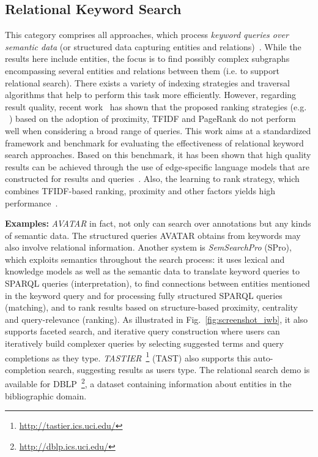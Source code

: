 \subsection{Relational Keyword Search}
This category comprises all approaches, which process \emph{keyword queries over semantic data} (or structured data capturing entities and relations)~\cite{DBLP:conf/icde/TranWRC09,DBLP:conf/cikm/LadwigT11}. While the results here include entities, the focus is to find possibly complex subgraphs encompassing several entities and relations between them (i.e. to support relational search). There exists a variety of indexing strategies and traversal algorithms that help to perform this task more efficiently. However, regarding result quality, recent work~\cite{DBLP:conf/cikm/CoffmanW10} has shown that the proposed ranking strategies (e.g. ~\cite{DBLP:conf/icde/TranWRC09,DBLP:conf/sigmod/LiuYMC06}) based on the adoption of proximity, TFIDF and PageRank do not perform well when considering a broad range of queries. This work aims at a standardized framework and benchmark for evaluating the effectiveness of relational keyword search approaches. Based on this benchmark, it has been shown that high quality results can be achieved through the use of edge-specific language models that are constructed for results and queries~\cite{DBLP:conf/cikm/BicerTN11}. Also, the learning to rank strategy, which combines TFIDF-based ranking, proximity and other factors yields high performance~\cite{DBLP:conf/cikm/CoffmanW11}. 

\textbf{Examples:} \emph{AVATAR} in fact, not only can search over annotations but any kinds of semantic data. The structured queries AVATAR obtains from keywords may also involve relational information. Another system is \emph{SemSearchPro} (SPro), which exploits semantics throughout the search process: it uses lexical and knowledge models as well as the semantic data to translate keyword queries to SPARQL queries (interpretation), to find connections between entities mentioned in the keyword query and for processing fully structured SPARQL queries (matching), and to rank results based on structure-based proximity, centrality and query-relevance (ranking). As illustrated in Fig.~\ref{fig:screenshot_iwb}, it also supports faceted search, and iterative query construction where users can iteratively build complexer queries by selecting suggested terms and query completions as they type. \emph{TASTIER}~\footnote{\url{http://tastier.ics.uci.edu/}} (TAST) also supports this auto-completion search, suggesting results as users type. The relational search demo is available for DBLP~\footnote{\url{http://dblp.ics.uci.edu/}}, a dataset containing information about entities in the bibliographic domain. 

